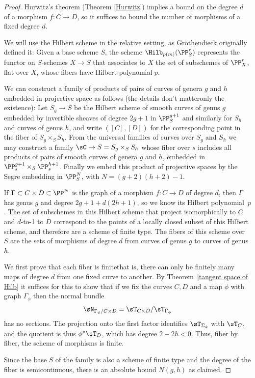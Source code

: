  \begin{proof}
Hurwitz's theorem
%
(Theorem \ref{Hurwitz}) implies a bound on the
degree $d$ of a morphism $f : C \to D$, so it suffices to
 bound the number of morphisms of a fixed degree $d$.

 We will use the Hilbert scheme in the relative setting, as
%
Grothendieck
 originally defined it: Given a base scheme $S$,
the scheme $\Hilb_{p(m)}(\PP_{S}^{r})$ represents the functor on
$S$-schemes $X\to S$ that associates to
$X$ the set of subschemes of $\PP_{X}^{r}$, flat over $X$, whose fibers
have Hilbert polynomial $p$.

We can construct a family of products of pairs of curves of genera $g$
and $h$ embedded in projective space as follows
(the details don't matter\emdash only the existence):
Let $S_{g}\to S$ be the Hilbert scheme of smooth curves of genus $g$
embedded by invertible sheaves of degree $2g+1$
in $\PP^{g+1}_{S}$
and similarly for $S_{h}$ and curves of genus $h$, and write $([C],[D])$
for the corresponding point in the fiber
of $S_{g}\times_{S}S_{h}$. From the universal families of curves over
$S_{g}$ and
$S_{h}$ we may construct a family $\sC \to S= S_{g}\times_{S} S_{h}$
whose fiber over $s$ includes all products of
pairs of smooth curves of genera $g$ and $h$, embedded in
$\PP_{s}^{g+1}\times_{S}\PP_{s}^{h+1}$. Finally we embed
this product of projective spaces by the Segre embedding in $\PP_{S}^{N}$,
with $N = (g+2)(h+2)-1$.
{\meshing[-3pt]\par}

If $\Gamma \subset C \times D \subset \PP^N$ is the graph of a morphism $f
: C \to D$ of degree $d$, then $\Gamma$ has genus $g$ and degree $2g+1 +
d(2h+1)$, so we know its Hilbert polynomial~$p$. The set of
subschemes in this Hilbert scheme that project isomorphically to $C$
and $d$-to-1 to $D$ correspond to the
points of a  locally closed
subset of
this Hilbert scheme, and therefore
%
are a
scheme of finite type.
%
The fibers
of this scheme over $S$ are the sets of morphisms of degree $d$ from
curves of genus $g$ to curves of genus $h$.

We first prove that each fiber is finite\emdash that is, there can only
be finitely many maps of degree $d$ from
one fixed curve to another.  By Theorem~\ref{tangent space of Hilb} it
suffices for this to show that if we fix the curves $C,D$ and a map $\phi$
with graph $\Gamma_{\phi}$
then the normal bundle
$$
\sN_{\Gamma_{\phi}/C\times D} = \sT_{C\times D}/\sT_{\Gamma_{\phi}}
$$
has no sections. The projection onto the first factor identifies
$\sT_{\Sigma_{\phi}}$ with $\sT_{C}$,
and the quotient is thus $\phi^{*} \sT_{D}$, which has degree
$2-2h<0$. Thus, fiber by fiber,
the scheme of morphisms is finite.

Since the base $S$ of the family is also a scheme of finite type and
%
the degree of the fiber is semicontinuous,
there is an absolute bound $N(g,h)$ as claimed.
 \end{proof}

